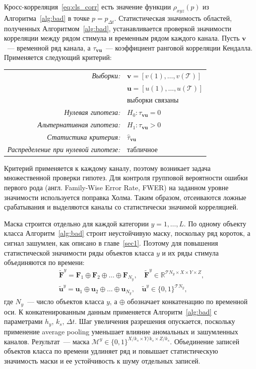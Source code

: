 Кросс-корреляция~\eqref{eq:cls_corr} есть значение функции $\rho_{xyz}(p)$ из Алгоритма~\ref{alg:bad} в точке $p = p_{\Delta t}$. Статистическая значимость областей, полученных Алгоритмом~\ref{alg:bad}, устанавливается проверкой значимости корреляции между рядом стимула и временным рядом каждого канала. Пусть $\mathbf{v}$~--- временной ряд канала, а $\tau_{\mathbf{v}\mathbf{u}}$~--- коэффициент ранговой корреляции Кендалла. Применяется следующий критерий:
\begin{center}
    \begin{tabular}{rl}
    \textit{Выборки:}                        & $\mathbf{v}=\left[v(1),\ldots,v(\mathcal{T})\right]$\\
                                    & $\mathbf{u}=\left[u(1),\ldots,u(\mathcal{T})\right]$\\
                                    & выборки связаны\\
    \textit{Нулевая гипотеза:}                & $H_0\colon \tau_{\mathbf{v}\mathbf{u}}=0$ \\
    \textit{Альтернативная гипотеза:}         & $H_1\colon \tau_{\mathbf{v}\mathbf{u}}>0$ \\
    \textit{Статистика критерия:}             & $\hat{\tau}_{\mathbf{v}\mathbf{u}}$ \\
    \textit{Распределение при нулевой гипотезе:} & табличное\\
    \end{tabular}
\end{center}
Критерий применяется к каждому каналу, поэтому возникает задача множественной проверки гипотез. Для контроля групповой вероятности ошибки первого рода (англ. Family-Wise Error Rate, FWER) на заданном уровне значимости используется поправка Холма. Таким образом, отсеиваются ложные срабатывания и выделяются каналы со статистически значимой корреляцией.

Маска строится отдельно для каждой категории $y = 1, \ldots, L$. По одному объекту класса Алгоритм~\ref{alg:bad} строит неустойчивую маску, поскольку ряд короток, а сигнал зашумлен, как описано в главе~\ref{sec1}. Поэтому для повышения статистической значимости ряды объектов класса $y$ и их ряды стимула объединяются по времени:
\begin{align*}
& \widetilde{\mathbf{F}}^{y} = \mathbf{F}_1 \oplus \mathbf{F}_2 \oplus \ldots \oplus \mathbf{F}_{N_y}, \quad \widetilde{\mathbf{F}}^{y} \in \mathbb{R}^{\mathcal{T} N_y \times X \times Y \times Z},\\
& \widetilde{\mathbf{u}}^{y} = \mathbf{u}_1 \oplus \mathbf{u}_2 \oplus \ldots \oplus \mathbf{u}_{N_y}, \quad \widetilde{\mathbf{u}}^{y} \in \{0, 1\}^{\mathcal{T} N_y},
\end{align*}
где $N_y$~--- число объектов класса $y$, а $\oplus$ обозначает конкатенацию по временной оси. К конкатенированным данным применяется Алгоритм~\ref{alg:bad} с параметрами $h_y$, $k_s$, $\Delta t$. Шаг увеличения разрешения опускается, поскольку применение average pooling уменьшает влияние аномальных и зашумленных каналов. Результат~--- маска $\mathcal{M}^{y} \in \{0,1\}^{X/k_s \times Y/k_s \times Z/k_s}$. Объединение записей объектов класса по времени удлиняет ряд и повышает статистическую значимость маски и ее устойчивость к шуму отдельных записей.

